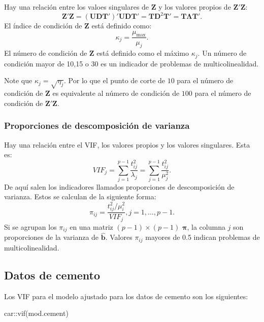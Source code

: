 \documentclass[
]{article}
\newenvironment{Shaded}{\begin{snugshade}}{\end{snugshade}}
\newcommand{\FunctionTok}[1]{\textcolor[rgb]{0.00,0.00,0.00}{#1}}
\newcommand{\NormalTok}[1]{#1}
\newcommand{\SpecialCharTok}[1]{\textcolor[rgb]{0.00,0.00,0.00}{#1}}
\begin{document}
Hay una relación entre los valoes singulares de \(\boldsymbol Z\) y los valores propios de \(\boldsymbol Z'\boldsymbol Z\):
\[
\boldsymbol Z'\boldsymbol Z= (\boldsymbol U\boldsymbol D\boldsymbol T')'\boldsymbol U\boldsymbol D\boldsymbol T' = \boldsymbol T\boldsymbol D^2\boldsymbol T' = \boldsymbol T\boldsymbol \Lambda\boldsymbol T'.
\]
El índice de condición de \(\boldsymbol Z\) está definido como:
\[
\kappa_{j} = \frac{\mu_{\mbox{max}}}{\mu_{j}}.
\]
El número de condición de \(\boldsymbol Z\) está definido como el máximo \(\kappa_{j}\). Un número de condición mayor de 10,15 o 30 es un indicador de problemas de multicolinealidad.

Note que \(\kappa_{j} = \sqrt{\eta_{j}}\). Por lo que el punto de corte de \(10\) para el número de condición de \(\boldsymbol Z\) es equivalente al número de condición de \(100\) para el número de condición de \(\boldsymbol Z'\boldsymbol Z\).

\hypertarget{proporciones-de-descomposiciuxf3n-de-varianza}{%
\subsubsection{Proporciones de descomposición de varianza}\label{proporciones-de-descomposiciuxf3n-de-varianza}}

Hay una relación entre el VIF, los valores propios y los valores singulares. Esta es:
\[
VIF_{j} = \sum_{j=1}^{p-1}\frac{t_{ij}^{2}}{\lambda_{j}} = \sum_{j=1}^{p-1}\frac{t_{ij}^{2}}{\mu_{j}^2}.
\]
De aquí salen los indicadores llamados proporciones de descomposición de varianza. Estos se calculan de la siguiente forma:
\[
\pi_{ij} = \frac{t_{ij}^2 / \mu_{i}^2 }{VIF_{j}}, j = 1,\ldots, p-1.
\]
Si se agrupan los \(\pi_{ij}\) en una matriz \((p-1) \times (p-1)\) \(\boldsymbol \pi\), la columna \(j\) son proporciones de la varianza de \(\widehat{\boldsymbol b}\). Valores \(\pi_{ij}\) mayores de 0.5 indican problemas de multicolinealidad.

\hypertarget{datos-de-cemento}{%
\subsection{Datos de cemento}\label{datos-de-cemento}}

Los VIF para el modelo ajustado para los datos de cemento son los siguientes:

\begin{Shaded}
\begin{Highlighting}[]
\NormalTok{car}\SpecialCharTok{::}\FunctionTok{vif}\NormalTok{(mod.cement)}
\end{Highlighting}
\end{Shaded}
\end{document}
